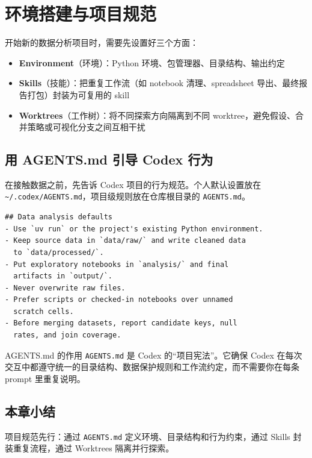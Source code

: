 \section{环境搭建与项目规范}

开始新的数据分析项目时，需要先设置好三个方面：

\begin{itemize}[nosep]
    \item \textbf{Environment}（环境）：Python 环境、包管理器、目录结构、输出约定
    \item \textbf{Skills}（技能）：把重复工作流（如 notebook 清理、spreadsheet 导出、最终报告打包）封装为可复用的 skill
    \item \textbf{Worktrees}（工作树）：将不同探索方向隔离到不同 worktree，避免假设、合并策略或可视化分支之间互相干扰
\end{itemize}

\subsection{用 AGENTS.md 引导 Codex 行为}

在接触数据之前，先告诉 Codex 项目的行为规范。个人默认设置放在 \texttt{\textasciitilde/.codex/AGENTS.md}，项目级规则放在仓库根目录的 \texttt{AGENTS.md}。

\begin{lstlisting}[caption={一个简洁的 AGENTS.md 示例},language={}]
## Data analysis defaults
- Use `uv run` or the project's existing Python environment.
- Keep source data in `data/raw/` and write cleaned data
  to `data/processed/`.
- Put exploratory notebooks in `analysis/` and final
  artifacts in `output/`.
- Never overwrite raw files.
- Prefer scripts or checked-in notebooks over unnamed
  scratch cells.
- Before merging datasets, report candidate keys, null
  rates, and join coverage.
\end{lstlisting}

\begin{importantbox}{AGENTS.md 的作用}
\texttt{AGENTS.md} 是 Codex 的``项目宪法''。它确保 Codex 在每次交互中都遵守统一的目录结构、数据保护规则和工作流约定，而不需要你在每条 prompt 里重复说明。
\end{importantbox}

\subsection{本章小结}
项目规范先行：通过 \texttt{AGENTS.md} 定义环境、目录结构和行为约束，通过 Skills 封装重复流程，通过 Worktrees 隔离并行探索。

